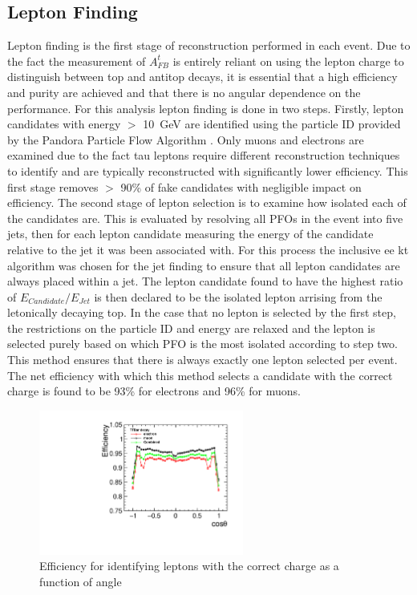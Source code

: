 \subsection{Lepton Finding}
\label{sec:lepfinding}
Lepton finding is the first stage of reconstruction performed in each event. Due to the fact the measurement of $A_{FB}^{t}$ is entirely reliant on using the lepton charge to distinguish between top and antitop decays, it is essential that a high efficiency and purity are achieved and that there is no angular dependence on the performance. For this analysis lepton finding is done in two steps. Firstly, lepton candidates with energy $>$ 10~GeV are identified using the particle ID provided by the Pandora Particle Flow Algorithm \cite{Thomson200925}. Only muons and electrons are examined due to the fact tau leptons require different reconstruction techniques to identify and are typically reconstructed with significantly lower efficiency. This first stage removes $>$ 90\% of fake candidates with negligible impact on efficiency. The second stage of lepton selection is to examine how isolated each of the candidates are. This is evaluated by resolving all PFOs in the event into five jets, then for each lepton candidate measuring the energy of the candidate relative to the jet it was been associated with. For this process the inclusive ee kt algorithm was chosen for the jet finding to ensure that all lepton candidates are always placed within a jet. The lepton candidate found to have the highest ratio of $E_{Candidate}/E_{Jet}$ is then declared to be the isolated lepton arrising from the letonically decaying top. In the case that no lepton is selected by the first step, the restrictions on the particle ID and energy are relaxed and the lepton is selected purely based on which PFO is the most isolated according to step two. This method ensures that there is always exactly one lepton selected per event. The net efficiency with which this method selects a candidate with the correct charge is found to be 93\% for electrons and 96\% for muons.

\begin{figure}
  \centering
  \includegraphics[width=0.6\textwidth]{TopAnalysis/figures/NetEfficiencys.pdf}
  \caption[Charge Tagging Efficiency]{Efficiency for identifying leptons with the correct charge as a function of angle}
  \label{fig:netefficiency}
\end{figure}


